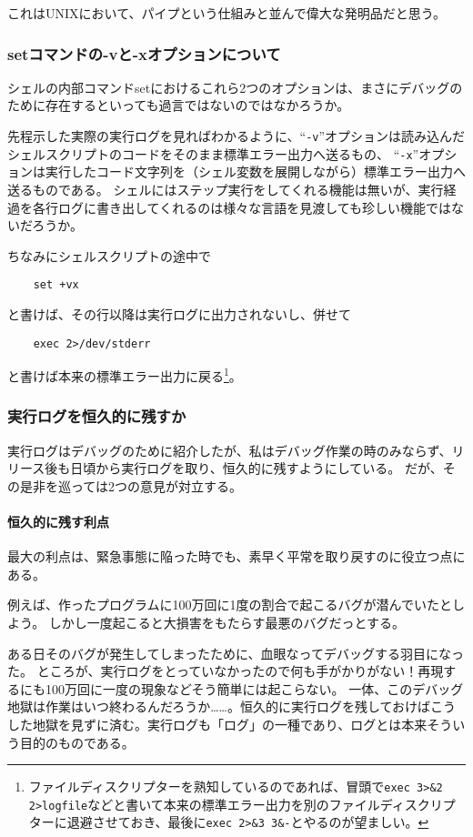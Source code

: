 これはUNIXにおいて、パイプという仕組みと並んで偉大な発明品だと思う。

\subsubsection*{setコマンドの-vと-xオプションについて}

シェルの内部コマンドsetにおけるこれら2つのオプションは、まさにデバッグのために存在するといっても過言ではないのではなかろうか。

先程示した実際の実行ログを見ればわかるように、``\verb|-v|''オプションは読み込んだシェルスクリプトのコードをそのまま標準エラー出力へ送るもの、
``\verb|-x|''オプションは実行したコード文字列を（シェル変数を展開しながら）標準エラー出力へ送るものである。
シェルにはステップ実行をしてくれる機能は無いが、実行経過を各行ログに書き出してくれるのは様々な言語を見渡しても珍しい機能ではないだろうか。

ちなみにシェルスクリプトの途中で
\begin{verbatim}
	set +vx
\end{verbatim}
と書けば、その行以降は実行ログに出力されないし、併せて
\begin{verbatim}
	exec 2>/dev/stderr
\end{verbatim}
と書けば本来の標準エラー出力に戻る\footnote{ファイルディスクリプターを熟知しているのであれば、冒頭で\verb|exec 3>&2 2>logfile|などと書いて本来の標準エラー出力を別のファイルディスクリプターに退避させておき、最後に\verb|exec 2>&3 3&-|とやるのが望ましい。}。


\subsubsection*{実行ログを恒久的に残すか}

実行ログはデバッグのために紹介したが、私はデバッグ作業の時のみならず、リリース後も日頃から実行ログを取り、恒久的に残すようにしている。
だが、その是非を巡っては2つの意見が対立する。

\paragraph{恒久的に残す利点}
最大の利点は、緊急事態に陥った時でも、素早く平常を取り戻すのに役立つ点にある。

例えば、作ったプログラムに100万回に1度の割合で起こるバグが潜んでいたとしよう。
しかし一度起こると大損害をもたらす最悪のバグだっとする。

ある日そのバグが発生してしまったために、血眼なってデバッグする羽目になった。
ところが、実行ログをとっていなかったので何も手がかりがない！再現するにも100万回に一度の現象などそう簡単には起こらない。
一体、このデバッグ地獄は作業はいつ終わるんだろうか……。恒久的に実行ログを残しておけばこうした地獄を見ずに済む。実行ログも「ログ」の一種であり、ログとは本来そういう目的のものである。

